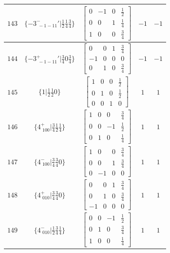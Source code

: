 \documentclass[fleqn,8pt]{jsarticle}
\begin{document}
\begin{longtable}{ccccc}
$ 143 $ & $ \{-3^{-}_{\,\,-1-11}{}'|\frac{1}{2} \frac{1}{4} \frac{3}{4}\} $ & $ \begin{bmatrix} 0 & -1 & 0 & \frac{1}{2} \\ 0 & 0 & 1 & \frac{1}{4} \\ 1 & 0 & 0 & \frac{3}{4} \end{bmatrix} $ & $ -1 $ & $ -1 $ \\ \hline
$ 144 $ & $ \{-3^{+}_{\,\,-1-11}{}'|\frac{3}{4} 0 \frac{3}{4}\} $ & $ \begin{bmatrix} 0 & 0 & 1 & \frac{3}{4} \\ -1 & 0 & 0 & 0 \\ 0 & 1 & 0 & \frac{3}{4} \end{bmatrix} $ & $ -1 $ & $ -1 $ \\ \hline
$ 145 $ & $ \{1|\frac{1}{2} \frac{1}{2} 0\} $ & $ \begin{bmatrix} 1 & 0 & 0 & \frac{1}{2} \\ 0 & 1 & 0 & \frac{1}{2} \\ 0 & 0 & 1 & 0 \end{bmatrix} $ & $ 1 $ & $ 1 $ \\ \hline
$ 146 $ & $ \{4^{+}_{\,\,100}|\frac{3}{4} \frac{1}{2} \frac{1}{4}\} $ & $ \begin{bmatrix} 1 & 0 & 0 & \frac{3}{4} \\ 0 & 0 & -1 & \frac{1}{2} \\ 0 & 1 & 0 & \frac{1}{4} \end{bmatrix} $ & $ 1 $ & $ 1 $ \\ \hline
$ 147 $ & $ \{4^{-}_{\,\,100}|\frac{3}{4} \frac{3}{4} 0\} $ & $ \begin{bmatrix} 1 & 0 & 0 & \frac{3}{4} \\ 0 & 0 & 1 & \frac{3}{4} \\ 0 & -1 & 0 & 0 \end{bmatrix} $ & $ 1 $ & $ 1 $ \\ \hline
$ 148 $ & $ \{4^{+}_{\,\,010}|\frac{3}{4} \frac{3}{4} 0\} $ & $ \begin{bmatrix} 0 & 0 & 1 & \frac{3}{4} \\ 0 & 1 & 0 & \frac{3}{4} \\ -1 & 0 & 0 & 0 \end{bmatrix} $ & $ 1 $ & $ 1 $ \\ \hline
$ 149 $ & $ \{4^{-}_{\,\,010}|\frac{1}{2} \frac{3}{4} \frac{1}{4}\} $ & $ \begin{bmatrix} 0 & 0 & -1 & \frac{1}{2} \\ 0 & 1 & 0 & \frac{3}{4} \\ 1 & 0 & 0 & \frac{1}{4} \end{bmatrix} $ & $ 1 $ & $ 1 $ \\ \hline

\end{longtable}
\end{document}
